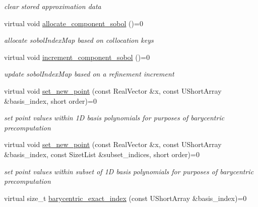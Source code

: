\begin{DoxyCompactItemize}
\begin{DoxyCompactList}\small\item\em clear stored approximation data \end{DoxyCompactList}\item 
virtual void \hyperlink{classPecos_1_1SharedInterpPolyApproxData_a3f12e868d8f2a63dbbb4eaba76b0ca73}{allocate\+\_\+component\+\_\+sobol} ()=0\label{classPecos_1_1SharedInterpPolyApproxData_a3f12e868d8f2a63dbbb4eaba76b0ca73}

\begin{DoxyCompactList}\small\item\em allocate sobol\+Index\+Map based on collocation keys \end{DoxyCompactList}\item 
virtual void \hyperlink{classPecos_1_1SharedInterpPolyApproxData_a901b3fa36e4464e6b9b9e1463dfe4434}{increment\+\_\+component\+\_\+sobol} ()=0\label{classPecos_1_1SharedInterpPolyApproxData_a901b3fa36e4464e6b9b9e1463dfe4434}

\begin{DoxyCompactList}\small\item\em update sobol\+Index\+Map based on a refinement increment \end{DoxyCompactList}\item 
virtual void \hyperlink{classPecos_1_1SharedInterpPolyApproxData_aaa884abe47a04ae88f2ccbdaeb44bf7e}{set\+\_\+new\+\_\+point} (const Real\+Vector \&x, const U\+Short\+Array \&basis\+\_\+index, short order)=0\label{classPecos_1_1SharedInterpPolyApproxData_aaa884abe47a04ae88f2ccbdaeb44bf7e}

\begin{DoxyCompactList}\small\item\em set point values within 1D basis polynomials for purposes of barycentric precomputation \end{DoxyCompactList}\item 
virtual void \hyperlink{classPecos_1_1SharedInterpPolyApproxData_ac1987c591a938c068d797b8e212f9d61}{set\+\_\+new\+\_\+point} (const Real\+Vector \&x, const U\+Short\+Array \&basis\+\_\+index, const Sizet\+List \&subset\+\_\+indices, short order)=0\label{classPecos_1_1SharedInterpPolyApproxData_ac1987c591a938c068d797b8e212f9d61}

\begin{DoxyCompactList}\small\item\em set point values within subset of 1D basis polynomials for purposes of barycentric precomputation \end{DoxyCompactList}\item 
virtual size\+\_\+t \hyperlink{classPecos_1_1SharedInterpPolyApproxData_a518ae68ac63e34396bda1ea2a7b196c0}{barycentric\+\_\+exact\+\_\+index} (const U\+Short\+Array \&basis\+\_\+index)=0\label{classPecos_1_1SharedInterpPolyApproxData_a518ae68ac63e34396bda1ea2a7b196c0}


\end{DoxyCompactItemize}
